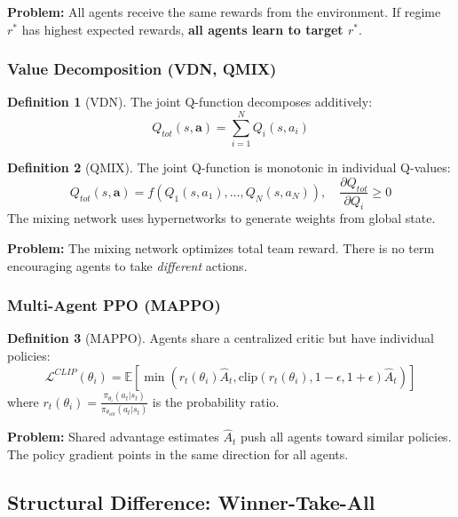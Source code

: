 \documentclass[11pt,a4paper]{article}
\theoremstyle{definition}
\newtheorem{definition}{Definition}[section]
\theoremstyle{plain}
\newcommand{\E}{\mathbb{E}}
\begin{document}
\textbf{Problem:} All agents receive the same rewards from the environment. If regime $r^*$ has highest expected rewards, \textbf{all agents learn to target $r^*$}.

\subsubsection{Value Decomposition (VDN, QMIX)}

\begin{definition}[VDN]
The joint Q-function decomposes additively:
\begin{equation}
Q_{tot}(s, \mathbf{a}) = \sum_{i=1}^N Q_i(s, a_i)
\end{equation}
\end{definition}

\begin{definition}[QMIX]
The joint Q-function is monotonic in individual Q-values:
\begin{equation}
Q_{tot}(s, \mathbf{a}) = f\left(Q_1(s, a_1), \ldots, Q_N(s, a_N)\right), \quad \frac{\partial Q_{tot}}{\partial Q_i} \geq 0
\end{equation}
The mixing network uses hypernetworks to generate weights from global state.
\end{definition}

\textbf{Problem:} The mixing network optimizes total team reward. There is no term encouraging agents to take \textit{different} actions.

\subsubsection{Multi-Agent PPO (MAPPO)}

\begin{definition}[MAPPO]
Agents share a centralized critic but have individual policies:
\begin{equation}
\mathcal{L}^{CLIP}(\theta_i) = \E\left[\min\left(r_t(\theta_i) \hat{A}_t, \text{clip}(r_t(\theta_i), 1-\epsilon, 1+\epsilon) \hat{A}_t\right)\right]
\end{equation}
where $r_t(\theta_i) = \frac{\pi_{\theta_i}(a_t|s_t)}{\pi_{\theta_{old}}(a_t|s_t)}$ is the probability ratio.
\end{definition}

\textbf{Problem:} Shared advantage estimates $\hat{A}_t$ push all agents toward similar policies. The policy gradient points in the same direction for all agents.

\subsection{Structural Difference: Winner-Take-All}
\end{document}
